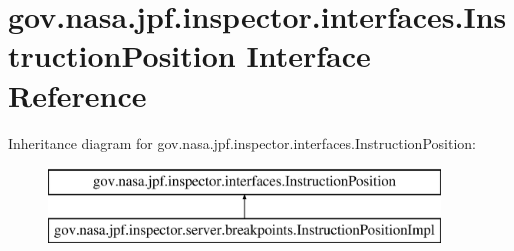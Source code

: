 \hypertarget{interfacegov_1_1nasa_1_1jpf_1_1inspector_1_1interfaces_1_1_instruction_position}{}\section{gov.\+nasa.\+jpf.\+inspector.\+interfaces.\+Instruction\+Position Interface Reference}
\label{interfacegov_1_1nasa_1_1jpf_1_1inspector_1_1interfaces_1_1_instruction_position}
Inheritance diagram for gov.\+nasa.\+jpf.\+inspector.\+interfaces.\+Instruction\+Position\+:\begin{figure}[H]
\begin{center}
\leavevmode
\includegraphics[height=2.000000cm]{interfacegov_1_1nasa_1_1jpf_1_1inspector_1_1interfaces_1_1_instruction_position}
\end{center}
\end{figure}
